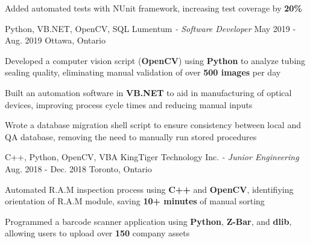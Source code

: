 \begin{siderules}
\begin{cventries}
{\begin{cvitems}
        \item {Added automated tests with NUnit framework, increasing test coverage by \textbf{20\%}}
      \end{cvitems}
    }
    \cventry
      {Python, VB.NET, OpenCV, SQL}
      {Lumentum\hspace{0.15em} \bodyfontlight\itshape{- Software Developer}}
      {May 2019 - Aug. 2019}
      {Ottawa, Ontario}
      {
        \begin{cvitems}
          \item {Developed a computer vision script (\textbf{OpenCV}) using \textbf{Python} to analyze tubing sealing quality, eliminating manual validation of over \textbf{500 images} per day}
          \item {Built an automation software in \textbf{VB.NET} to aid in manufacturing of optical devices, improving process cycle times and reducing manual inputs}
          \item {Wrote a database migration shell script to ensure consistency between local and QA database, removing the need to manually run stored procedures}
        \end{cvitems}
      }
    \cventry
      {C++, Python, OpenCV, VBA}
      {KingTiger Technology Inc.\hspace{0.15em} \bodyfontlight\itshape{- Junior Engineering}}
      {Aug. 2018 - Dec. 2018}
      {Toronto, Ontario}
      {
        \begin{cvitems}
          \item {Automated R.A.M inspection process using \textbf{C++} and \textbf{OpenCV}, identifiying orientation of R.A.M module, saving \textbf{10+ minutes} of manual sorting}
          \item {Programmed a barcode scanner application using \textbf{Python}, \textbf{Z-Bar}, and \textbf{dlib}, allowing users to upload over \textbf{150} company assets }
        \end{cvitems}
      }
  \end{cventries}
\end{siderules}